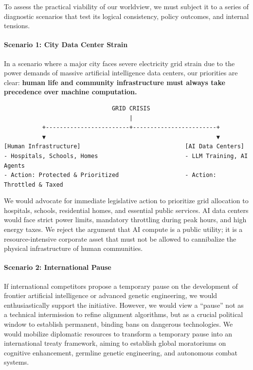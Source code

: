 To assess the practical viability of our worldview, we must subject it
to a series of diagnostic scenarios that test its logical consistency,
policy outcomes, and internal tensions.

\paragraph{Scenario 1: City Data Center
Strain}\label{scenario-1-city-data-center-strain-1}

In a scenario where a major city faces severe electricity grid strain
due to the power demands of massive artificial intelligence data
centers, our priorities are clear: \textbf{human life and community
infrastructure must always take precedence over machine computation.}

\begin{verbatim}
                               GRID CRISIS
                                    |
           +------------------------+------------------------+
           ▼                                                 ▼
[Human Infrastructure]                              [AI Data Centers]
- Hospitals, Schools, Homes                         - LLM Training, AI Agents
- Action: Protected & Prioritized                   - Action: Throttled & Taxed
\end{verbatim}

We would advocate for immediate legislative action to prioritize grid
allocation to hospitals, schools, residential homes, and essential
public services. AI data centers would face strict power limits,
mandatory throttling during peak hours, and high energy taxes. We reject
the argument that AI compute is a public utility; it is a
resource-intensive corporate asset that must not be allowed to
cannibalize the physical infrastructure of human communities.

\paragraph{Scenario 2: International
Pause}\label{scenario-2-international-pause-1}

If international competitors propose a temporary pause on the
development of frontier artificial intelligence or advanced genetic
engineering, we would enthusiastically support the initiative. However,
we would view a ``pause'' not as a technical intermission to refine
alignment algorithms, but as a crucial political window to establish
permanent, binding bans on dangerous technologies. We would mobilize
diplomatic resources to transform a temporary pause into an
international treaty framework, aiming to establish global moratoriums
on cognitive enhancement, germline genetic engineering, and autonomous
combat systems.


